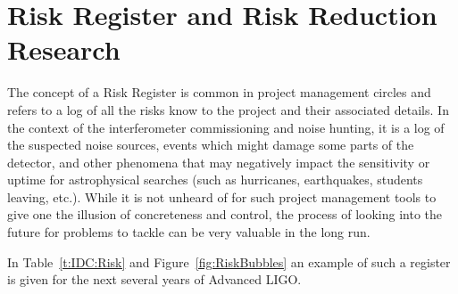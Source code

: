 \section{Risk Register and Risk Reduction Research}
\label{s:IDC:Risk}
The concept of a Risk Register is common in project management circles and refers
to a log of all the risks know to the project and their associated details. In
the context of the interferometer commissioning and noise hunting, it is a log of
the suspected noise sources, events which might damage some parts of the detector,
and other phenomena that may negatively impact the sensitivity or uptime for
astrophysical searches (such as hurricanes, earthquakes, students leaving, etc.).
While it is not unheard of for such project management tools to give one the
illusion of concreteness and control, the process of looking into the future
for problems to tackle can be very valuable in the long run.

In Table~\ref{t:IDC:Risk} and Figure~\ref{fig:RiskBubbles} an example of such
a register is given for the next several years of Advanced LIGO.


